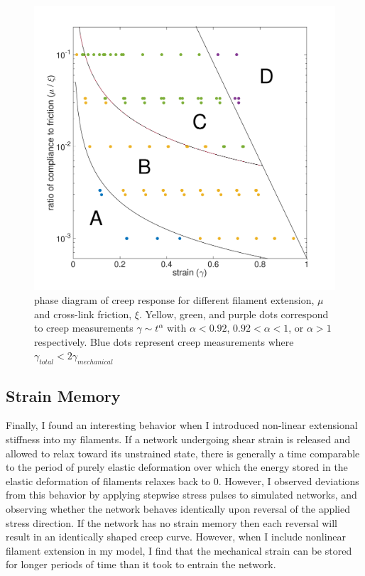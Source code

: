 \begin{figure}[h!]
\centering
\includegraphics[width=\hsize]{slippage/phase_diag}
\caption{\label{fig:phase_diag} phase diagram of creep response for different filament extension, $\mu$ and cross-link friction, $\xi$.  Yellow, green, and purple dots correspond to creep measurements $\gamma \sim t^\alpha$ with $\alpha<0.92$, $0.92<\alpha<1$, or $\alpha>1$ respectively.  Blue dots represent creep measurements where $\gamma_{total} < 2\gamma_{mechanical}$}
\end{figure}



\subsection{Strain Memory}
Finally, I found an interesting behavior when I introduced non-linear extensional stiffness into my filaments.  If a network undergoing shear strain is released and allowed to relax toward its unstrained state, there is generally a time comparable to the period of purely elastic deformation over which the energy stored in the elastic deformation of filaments relaxes back to 0.  However, I observed deviations from this behavior by applying stepwise stress pulses to simulated networks, and observing whether the network behaves identically upon reversal of the applied stress direction.  If the network has no strain memory then each reversal will result in an identically shaped creep curve.  However, when I include nonlinear filament extension in my model, I find that the mechanical strain can be stored for longer periods of time than it took to entrain the network.

